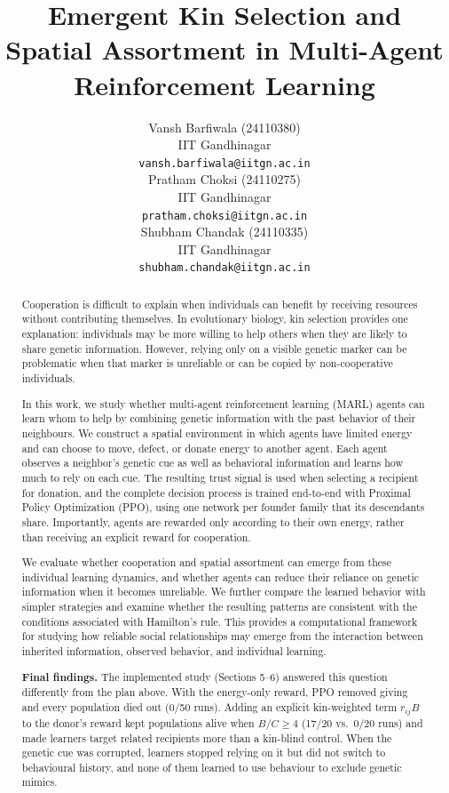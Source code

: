 \documentclass{article}
\title{Emergent Kin Selection and Spatial Assortment in Multi-Agent Reinforcement Learning}
\author{
  Vansh Barfiwala (24110380) \\
  IIT Gandhinagar \\
  \texttt{vansh.barfiwala@iitgn.ac.in} \\
  \And
  Pratham Choksi (24110275) \\
  IIT Gandhinagar \\
  \texttt{pratham.choksi@iitgn.ac.in} \\
  \And
  Shubham Chandak (24110335) \\
  IIT Gandhinagar \\
  \texttt{shubham.chandak@iitgn.ac.in} \\
}
\begin{document}
\maketitle


\begin{abstract}
Cooperation is difficult to explain when individuals can benefit by receiving resources without contributing themselves. In evolutionary biology, kin selection provides one explanation: individuals may be more willing to help others when they are likely to share genetic information. However, relying only on a visible genetic marker can be problematic when that marker is unreliable or can be copied by non-cooperative individuals.

In this work, we study whether multi-agent reinforcement learning (MARL) agents can learn whom to help by combining genetic information with the past behavior of their neighbours. We construct a spatial environment in which agents have limited energy and can choose to move, defect, or donate energy to another agent. Each agent observes a neighbor's genetic cue as well as behavioral information and learns how much to rely on each cue. The resulting trust signal is used when selecting a recipient for donation, and the complete decision process is trained end-to-end with Proximal Policy Optimization (PPO), using one network per founder family that its descendants share. Importantly, agents are rewarded only according to their own energy, rather than receiving an explicit reward for cooperation.

We evaluate whether cooperation and spatial assortment can emerge from these individual learning dynamics, and whether agents can reduce their reliance on genetic information when it becomes unreliable. We further compare the learned behavior with simpler strategies and examine whether the resulting patterns are consistent with the conditions associated with Hamilton's rule. This provides a computational framework for studying how reliable social relationships may emerge from the interaction between inherited information, observed behavior, and individual learning.

\textbf{Final findings.} The implemented study (Sections 5--6) answered this question differently from the plan above. With the energy-only reward, PPO removed giving and every population died out (0/50 runs). Adding an explicit kin-weighted term $r_{ij}B$ to the donor's reward kept populations alive when $B/C\ge4$ (17/20 vs.\ 0/20 runs) and made learners target related recipients more than a kin-blind control. When the genetic cue was corrupted, learners stopped relying on it but did not switch to behavioural history, and none of them learned to use behaviour to exclude genetic mimics.
\end{abstract}
\end{document}
